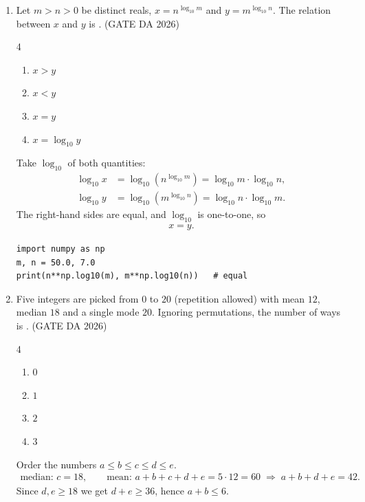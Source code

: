 \begin{enumerate}[label=\textbf{Q.\arabic*},leftmargin=*,start=1]
\item[\textbf{Q.4}] Let $m>n>0$ be distinct reals, $x=n^{\log_{10}m}$ and
$y=m^{\log_{10}n}$. The relation between $x$ and $y$ is \underline{\hspace{1.5cm}}.
\hfill (GATE DA 2026)
\begin{multicols}{4}
\begin{enumerate}[label=(\alph*),itemsep=0pt]
 \item $x>y$ \item $x<y$ \item $x=y$ \item $x=\log_{10}y$
\end{enumerate}
\end{multicols}
\solution
Take $\log_{10}$ of both quantities:
\begin{align}
\log_{10}x &= \log_{10}\!\left(n^{\log_{10}m}\right)=\log_{10}m\cdot\log_{10}n,\\
\log_{10}y &= \log_{10}\!\left(m^{\log_{10}n}\right)=\log_{10}n\cdot\log_{10}m .
\end{align}
The right-hand sides are equal, and $\log_{10}$ is one-to-one, so
\begin{align}
\boxed{x=y}.
\end{align}
\begin{lstlisting}
import numpy as np
m, n = 50.0, 7.0
print(n**np.log10(m), m**np.log10(n))   # equal
\end{lstlisting}

\item[\textbf{Q.7}] Five integers are picked from $0$ to $20$ (repetition allowed)
with mean $12$, median $18$ and a single mode $20$. Ignoring permutations, the
number of ways is \underline{\hspace{1.5cm}}.
\hfill (GATE DA 2026)
\begin{multicols}{4}
\begin{enumerate}[label=(\alph*),itemsep=0pt]
 \item $0$ \item $1$ \item $2$ \item $3$
\end{enumerate}
\end{multicols}
\solution
Order the numbers $a\le b\le c\le d\le e$.
\begin{align}
\text{median: } c=18,\qquad
\text{mean: } a+b+c+d+e=5\cdot 12=60 \;\Rightarrow\; a+b+d+e=42 .
\end{align}
Since $d,e\ge 18$ we get $d+e\ge 36$, hence $a+b\le 6$.


\end{enumerate}
